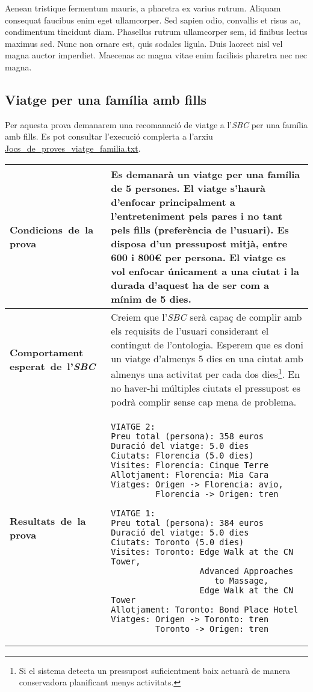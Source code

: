 \documentclass[11pt,a4paper]{article}
\begin{document}
Aenean tristique fermentum mauris, a pharetra ex varius rutrum. Aliquam consequat faucibus enim eget ullamcorper. Sed sapien odio, convallis et risus ac, condimentum tincidunt diam. Phasellus rutrum ullamcorper sem, id finibus lectus maximus sed. Nunc non ornare est, quis sodales ligula. Duis laoreet nisl vel magna auctor imperdiet. Maecenas ac magna vitae enim facilisis pharetra nec nec magna.


\subsection{Viatge per una família amb fills}
Per aquesta prova demanarem una recomanació de viatge a l'\emph{SBC} per una família amb fills. Es pot consultar l'execució complerta a l'arxiu \url{Jocs_de_proves_viatge_familia.txt}. \\

\noindent
\begin{tabular}{|p{}|p{}|}
\hline
\textbf{\mbox{Condicions de la} \mbox{prova}} & Es demanarà un viatge per una família de 5 persones. El viatge s'haurà d'enfocar principalment a l'entreteniment pels pares i no tant pels fills (preferència de l'usuari). Es disposa d'un pressupost mitjà, entre 600 i 800\euro{} per persona. El viatge es vol enfocar únicament a una ciutat i la durada d'aquest ha de ser com a mínim de 5 dies. \\
\hline
\textbf{Comportament \mbox{esperat de l'\emph{SBC}}} & Creiem que l'\emph{SBC} serà capaç de complir amb els requisits de l'usuari considerant el contingut de l'ontologia. Esperem que es doni un viatge d'almenys 5 dies en una ciutat amb almenys una activitat per cada dos dies\footnote{Si el sistema detecta un pressupost suficientment baix actuarà de manera conservadora planificant menys activitats.}. En no haver-hi múltiples ciutats el pressupost es podrà complir sense cap mena de problema. \\
\hline
\textbf{\mbox{Resultats de la} \mbox{prova}} & \begin{verbatim}
VIATGE 2:
Preu total (persona): 358 euros
Duració del viatge: 5.0 dies
Ciutats: Florencia (5.0 dies)
Visites: Florencia: Cinque Terre
Allotjament: Florencia: Mia Cara
Viatges: Origen -> Florencia: avio, 
         Florencia -> Origen: tren

VIATGE 1:
Preu total (persona): 384 euros
Duració del viatge: 5.0 dies
Ciutats: Toronto (5.0 dies)
Visites: Toronto: Edge Walk at the CN Tower, 
                  Advanced Approaches 
                     to Massage, 
                  Edge Walk at the CN Tower
Allotjament: Toronto: Bond Place Hotel
Viatges: Origen -> Toronto: tren
         Toronto -> Origen: tren
\end{verbatim}\\
\hline
\end{tabular}
\medskip
\end{document}

